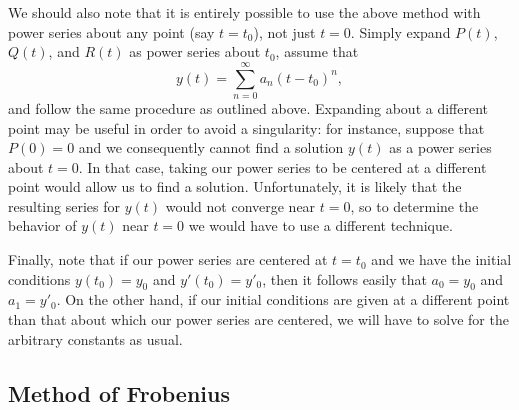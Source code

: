 \documentclass{myart}
\begin{document}
We should also note that it is entirely possible to use the above
method with power series about any point (say $t = t_0$), not just $t
= 0$. Simply expand $P(t)$, $Q(t)$, and $R(t)$ as power series about
$t_0$, assume that
\begin{equation*}
  y(t) = \sum_{n=0}^\infty a_n (t - t_0)^n,
\end{equation*}
and follow the same procedure as outlined above. Expanding about a
different point may be useful in order to avoid a singularity: for
instance, suppose that $P(0) = 0$ and we consequently cannot find a
solution $y(t)$ as a power series about $t = 0$. In that case, taking
our power series to be centered at a different point would allow us to
find a solution. Unfortunately, it is likely that the resulting series
for $y(t)$ would not converge near $t = 0$, so to determine the
behavior of $y(t)$ near $t = 0$ we would have to use a different
technique.

Finally, note that if our power series are centered at $t = t_0$ and
we have the initial conditions $y(t_0) = y_0$ and $y'(t_0) = y'_0$,
then it follows easily that $a_0 = y_0$ and $a_1 = y'_0$. On the other
hand, if our initial conditions are given at a different point than
that about which our power series are centered, we will have to solve
for the arbitrary constants as usual.

\subsection{Method of Frobenius}
\label{subsec:frobenius}
\end{document}
